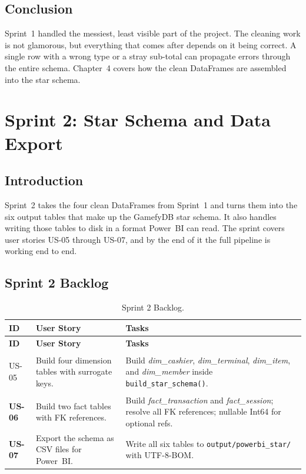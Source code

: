 \documentclass[12pt, a4paper]{report}
\begin{document}
\section{Conclusion}

Sprint~1 handled the messiest, least visible part of the project. The cleaning
work is not glamorous, but everything that comes after depends on it being correct.
A single row with a wrong type or a stray sub-total can propagate errors through
the entire schema. Chapter~4 covers how the clean DataFrames are assembled into
the star schema.

\chapter{Sprint 2: Star Schema and Data Export}

\section{Introduction}

Sprint~2 takes the four clean DataFrames from Sprint~1 and turns them into the six
output tables that make up the GamefyDB star schema. It also handles writing those
tables to disk in a format Power~BI can read. The sprint covers user stories US-05
through US-07, and by the end of it the full pipeline is working end to end.

\section{Sprint 2 Backlog}

\begin{longtable}{>{\bfseries}p{1.3cm} p{4.2cm} p{7cm}}
  \caption{Sprint 2 Backlog.\label{tab:sprint2_backlog}} \\
  \toprule
  \textbf{ID} & \textbf{User Story} & \textbf{Tasks} \\
  \midrule
  \endfirsthead
  \toprule
  \textbf{ID} & \textbf{User Story} & \textbf{Tasks} \\
  \midrule
  \endhead
  \bottomrule
  \endfoot

  US-05 & Build four dimension tables with surrogate keys.
        & Build \textit{dim\_cashier}, \textit{dim\_terminal}, \textit{dim\_item},
          and \textit{dim\_member} inside \texttt{build\_star\_schema()}. \\[4pt]
  US-06 & Build two fact tables with FK references.
        & Build \textit{fact\_transaction} and \textit{fact\_session}; resolve
          all FK references; nullable Int64 for optional refs. \\[4pt]
  US-07 & Export the schema as CSV files for Power~BI.
        & Write all six tables to \texttt{output/powerbi\_star/} with UTF-8-BOM. \\
\end{longtable}
\end{document}
